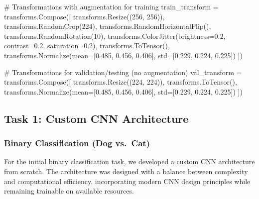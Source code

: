 \documentclass[
]{article}
\newenvironment{Shaded}{\begin{snugshade}}{\end{snugshade}}
\newcommand{\CommentTok}[1]{\textcolor[rgb]{0.37,0.37,0.37}{#1}}
\newcommand{\DecValTok}[1]{\textcolor[rgb]{0.68,0.00,0.00}{#1}}
\newcommand{\FloatTok}[1]{\textcolor[rgb]{0.68,0.00,0.00}{#1}}
\newcommand{\NormalTok}[1]{\textcolor[rgb]{0.00,0.23,0.31}{#1}}
\newcommand{\OperatorTok}[1]{\textcolor[rgb]{0.37,0.37,0.37}{#1}}
\begin{document}
\begin{Shaded}
\begin{Highlighting}[]
\CommentTok{\# Transformations with augmentation for training}
\NormalTok{train\_transform }\OperatorTok{=}\NormalTok{ transforms.Compose([}
\NormalTok{    transforms.Resize((}\DecValTok{256}\NormalTok{, }\DecValTok{256}\NormalTok{)),}
\NormalTok{    transforms.RandomCrop(}\DecValTok{224}\NormalTok{),}
\NormalTok{    transforms.RandomHorizontalFlip(),}
\NormalTok{    transforms.RandomRotation(}\DecValTok{10}\NormalTok{),}
\NormalTok{    transforms.ColorJitter(brightness}\OperatorTok{=}\FloatTok{0.2}\NormalTok{, contrast}\OperatorTok{=}\FloatTok{0.2}\NormalTok{, saturation}\OperatorTok{=}\FloatTok{0.2}\NormalTok{),}
\NormalTok{    transforms.ToTensor(),}
\NormalTok{    transforms.Normalize(mean}\OperatorTok{=}\NormalTok{[}\FloatTok{0.485}\NormalTok{, }\FloatTok{0.456}\NormalTok{, }\FloatTok{0.406}\NormalTok{], std}\OperatorTok{=}\NormalTok{[}\FloatTok{0.229}\NormalTok{, }\FloatTok{0.224}\NormalTok{, }\FloatTok{0.225}\NormalTok{])}
\NormalTok{])}

\CommentTok{\# Transformations for validation/testing (no augmentation)}
\NormalTok{val\_transform }\OperatorTok{=}\NormalTok{ transforms.Compose([}
\NormalTok{    transforms.Resize((}\DecValTok{224}\NormalTok{, }\DecValTok{224}\NormalTok{)),}
\NormalTok{    transforms.ToTensor(),}
\NormalTok{    transforms.Normalize(mean}\OperatorTok{=}\NormalTok{[}\FloatTok{0.485}\NormalTok{, }\FloatTok{0.456}\NormalTok{, }\FloatTok{0.406}\NormalTok{], std}\OperatorTok{=}\NormalTok{[}\FloatTok{0.229}\NormalTok{, }\FloatTok{0.224}\NormalTok{, }\FloatTok{0.225}\NormalTok{])}
\NormalTok{])}
\end{Highlighting}
\end{Shaded}

\subsection{Task 1: Custom CNN
Architecture}\label{task-1-custom-cnn-architecture}

\subsubsection{Binary Classification (Dog
vs.~Cat)}\label{binary-classification-dog-vs.-cat}

For the initial binary classification task, we developed a custom CNN
architecture from scratch. The architecture was designed with a balance
between complexity and computational efficiency, incorporating modern
CNN design principles while remaining trainable on available resources.
\end{document}

